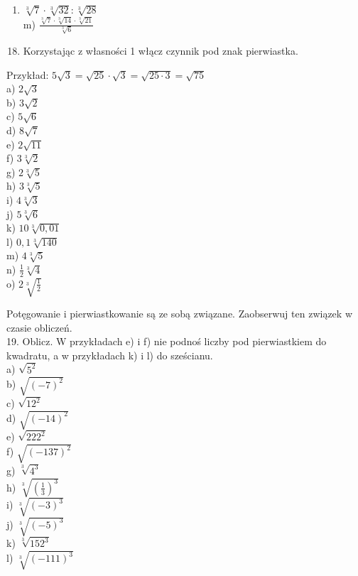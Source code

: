 \documentclass[10pt]{article}
\begin{document}
\begin{enumerate}
  \item \(\sqrt[3]{7} \cdot \sqrt[3]{32}: \sqrt[3]{28}\)\\
m) \(\frac{\sqrt[3]{7} \cdot \sqrt[3]{14} \cdot \sqrt[3]{21}}{\sqrt[3]{6}}\)
\end{enumerate}

\begin{enumerate}
  \setcounter{enumi}{17}
  \item Korzystając z własności 1 włącz czynnik pod znak pierwiastka.
\end{enumerate}

Przykład: \(5 \sqrt{3}=\sqrt{25} \cdot \sqrt{3}=\sqrt{25 \cdot 3}=\sqrt{75}\)\\
a) \(2 \sqrt{3}\)\\
b) \(3 \sqrt{2}\)\\
c) \(5 \sqrt{6}\)\\
d) \(8 \sqrt{7}\)\\
e) \(2 \sqrt{11}\)\\
f) \(3 \sqrt[3]{2}\)\\
g) \(2 \sqrt[3]{5}\)\\
h) \(3 \sqrt[3]{5}\)\\
i) \(4 \sqrt[3]{3}\)\\
j) \(5 \sqrt[3]{6}\)\\
k) \(10 \sqrt[3]{0,01}\)\\
l) \(0,1 \sqrt[3]{140}\)\\
m) \(4 \sqrt[3]{5}\)\\
n) \(\frac{1}{2} \sqrt[3]{4}\)\\
o) \(2 \sqrt[3]{\frac{1}{2}}\)

Potęgowanie i pierwiastkowanie są ze sobą związane. Zaobserwuj ten związek w czasie obliczeń.\\
19. Oblicz. W przykładach e) i f) nie podnoś liczby pod pierwiastkiem do kwadratu, a w przykładach k) i l) do sześcianu.\\
a) \(\sqrt{5^{2}}\)\\
b) \(\sqrt{(-7)^{2}}\)\\
c) \(\sqrt{12^{2}}\)\\
d) \(\sqrt{(-14)^{2}}\)\\
e) \(\sqrt{222^{2}}\)\\
f) \(\sqrt{(-137)^{2}}\)\\
g) \(\sqrt[3]{4^{3}}\)\\
h) \(\sqrt[3]{\left(\frac{1}{3}\right)^{3}}\)\\
i) \(\sqrt[3]{(-3)^{3}}\)\\
j) \(\sqrt[3]{(-5)^{3}}\)\\
k) \(\sqrt[3]{152^{3}}\)\\
l) \(\sqrt[3]{(-111)^{3}}\)
\end{document}
